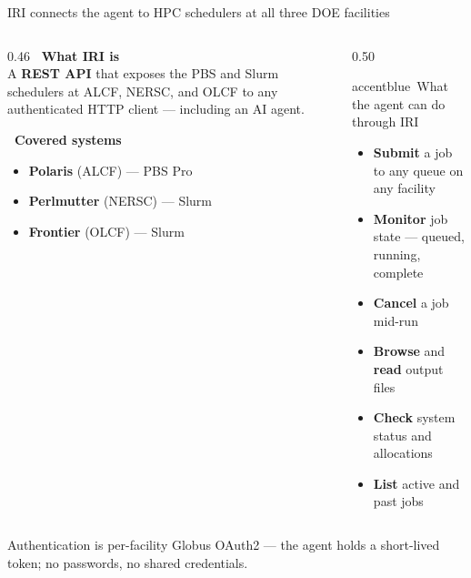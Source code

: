 \documentclass[aspectratio=169,11pt]{beamer}
\begin{document}
\begin{frame}{IRI connects the agent to HPC schedulers at all three DOE facilities}
  \begin{columns}[t]
    \begin{column}{0.46\textwidth}
      \small
      {\bfseries\color{accentblue}\faPlug\ What IRI is}\\[4pt]
      A \textbf{REST API} that exposes the PBS and Slurm schedulers at ALCF,
      NERSC, and OLCF to any authenticated HTTP client — including an AI agent.

      \vspace{8pt}
      {\bfseries\color{accentblue}\faServer\ Covered systems}
      \begin{itemize}\setlength\itemsep{1pt}
        \item[\faCheckCircle] \textbf{Polaris} (ALCF) — PBS Pro
        \item[\faCheckCircle] \textbf{Perlmutter} (NERSC) — Slurm
        \item[\faCheckCircle] \textbf{Frontier} (OLCF) — Slurm
      \end{itemize}
    \end{column}
    \begin{column}{0.50\textwidth}
      \begin{featbox}{accentblue}{\faPlug\ What the agent can do through IRI}
        \footnotesize
        \begin{itemize}\setlength\itemsep{2pt}
          \item[\faBolt] \textbf{Submit} a job to any queue on any facility
          \item[\faSync] \textbf{Monitor} job state — queued, running, complete
          \item[\faTimes] \textbf{Cancel} a job mid-run
          \item[\faFolder] \textbf{Browse} and \textbf{read} output files
          \item[\faChartLine] \textbf{Check} system status and allocations
          \item[\faList] \textbf{List} active and past jobs
        \end{itemize}
      \end{featbox}
    \end{column}
  \end{columns}
  \vspace{5pt}
  \begin{center}
    {\footnotesize\color{midgray}
      Authentication is per-facility Globus OAuth2 — the agent holds a short-lived token;
      no passwords, no shared credentials.}
  \end{center}
\end{frame}
\end{document}
